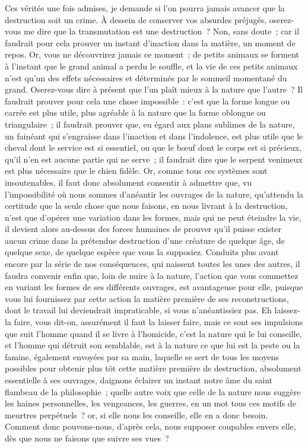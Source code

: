 \documentclass[french,twoside]{book} %
\begin{document}
Ces vérités une fois admises, je demande si l’on pourra jamais avancer que la destruction soit un crime. À dessein de conserver vos absurdes préjugés, oserez-vous me dire que la transmutation est une destruction ? Non, sans doute ; car il faudrait pour cela prouver un instant d’inaction dans la matière, un moment de repos. Or, vous ne découvrirez jamais ce moment ; de petits animaux se forment à l’instant que le grand animal a perdu le souffle, et la vie de ces petits animaux n’est qu’un des effets nécessaires et déterminés par le sommeil momentané du grand. Oserez-vous dire à présent que l’un plaît mieux à la nature que l’autre ? Il faudrait prouver pour cela une chose impossible : c’est que la forme longue ou carrée est plus utile, plus agréable à la nature que la forme oblongue ou triangulaire ; il faudrait prouver que, eu égard aux plans sublimes de la nature, un fainéant qui s’engraisse dans l’inaction et dans l’indolence, est plus utile que le cheval dont le service est si essentiel, ou que le bœuf dont le corps est si précieux, qu’il n’en est aucune partie qui ne serve ; il faudrait dire que le serpent venimeux est plus nécessaire que le chien fidèle. Or, comme tous ces systèmes sont insoutenables, il faut donc absolument consentir à admettre que, vu l’impossibilité où nous sommes d’anéantir les ouvrages de la nature, qu’attendu la certitude que la seule chose que nous faisons, en nous livrant à la destruction, n’est que d’opérer une variation dans les formes, mais qui ne peut éteindre la vie, il devient alors au-dessus des forces humaines de prouver qu’il puisse exister aucun crime dans la prétendue destruction d’une créature de quelque âge, de quelque sexe, de quelque espèce que vous la supposiez. Conduits plus avant encore par la série de nos conséquences, qui naissent toutes les unes des autres, il faudra convenir enfin que, loin de nuire à la nature, l’action que vous commettez en variant les formes de ses différents ouvrages, est avantageuse pour elle, puisque vous lui fournissez par cette action la matière première de ses reconstructions, dont le travail lui deviendrait impraticable, si vous n’anéantissiez pas. Eh laissez-la faire, vous dit-on, assurément il faut la laisser faire, mais ce sont ses impulsions que suit l’homme quand il se livre à l’homicide, c’est la nature qui le lui conseille, et l’homme qui détruit son semblable, est à la nature ce que lui est la peste ou la famine, également envoyées par sa main, laquelle se sert de tous les moyens possibles pour obtenir plus tôt cette matière première de destruction, absolument essentielle à ses ouvrages, daignons éclairer un instant notre âme du saint flambeau de la philosophie ; quelle autre voix que celle de la nature nous suggère les haines personnelles, les vengeances, les guerres, en un mot tous ces motifs de meurtres perpétuels ? or, si elle nous les conseille, elle en a donc besoin. Comment donc pouvons-nous, d’après cela, nous supposer coupables envers elle, dès que nous ne faisons que suivre ses vues ?\par
\end{document}
